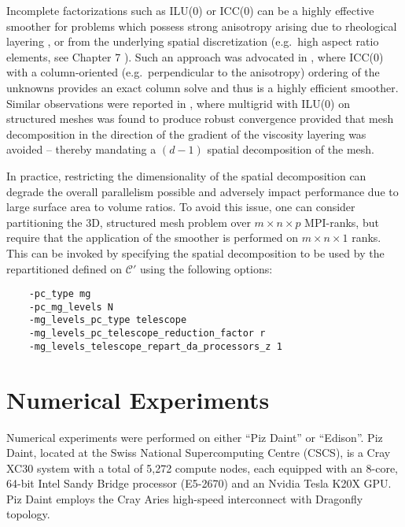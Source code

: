 \documentclass[]{siamart0216}
\begin{document}
	Incomplete factorizations such as ILU(0) or ICC(0) can be a highly effective smoother 
	for problems which possess strong anisotropy arising due to rheological layering \cite{lechmann2011comparing}, or 
	from the underlying spatial discretization (e.g.~high aspect ratio elements, see Chapter 7 \cite{trottenberg2000multigrid}). 
	Such an approach was advocated in \cite{brown2013achieving, isaac.sisc.2015}, where ICC(0) with a 
	column-oriented (e.g.~perpendicular to the anisotropy) ordering of the unknowns  provides an exact column solve
	and thus is a highly efficient smoother. 
	Similar observations were reported in \cite{lechmann2011comparing}, where multigrid with 
	ILU(0) on structured meshes was found to produce robust convergence provided that mesh decomposition 
	in the direction of the gradient of the viscosity layering was avoided -- thereby mandating a $(d-1)$ spatial decomposition of the mesh.
	
	In practice, restricting the dimensionality of the spatial decomposition can degrade the overall parallelism possible and 
	adversely impact performance due to large surface area to volume ratios. 
	To avoid this issue, one can consider partitioning the 3D, structured mesh problem over $m \times n \times p$ MPI-ranks, 
	but require that the application of the smoother is performed on $m \times n \times 1$ ranks. 
	This can be invoked by specifying the spatial decomposition to be used by the repartitioned  defined on $\mathcal C'$ 
	using the following options:
\begin{tcolorbox}[colframe=red,colback=cornsilk,boxrule=0.5pt,arc=4pt,
      left=-6pt,right=6pt,top=6pt,bottom=6pt,boxsep=0pt]
	\begin{verbatim}
    -pc_type mg
    -pc_mg_levels N
    -mg_levels_pc_type telescope
    -mg_levels_pc_telescope_reduction_factor r
    -mg_levels_telescope_repart_da_processors_z 1
	\end{verbatim}
\end{tcolorbox}


\section{Numerical Experiments}

Numerical experiments were performed on either ``Piz Daint'' or ``Edison''.
Piz Daint, located at the Swiss National Supercomputing Centre (CSCS),  is a Cray XC30 system 
with a total of 5,272 compute nodes, each equipped with an 8-core, 
64-bit Intel Sandy Bridge processor (E5-2670) and an Nvidia Tesla K20X GPU.
Piz Daint employs the Cray Aries high-speed interconnect with Dragonfly topology. 
\end{document}
